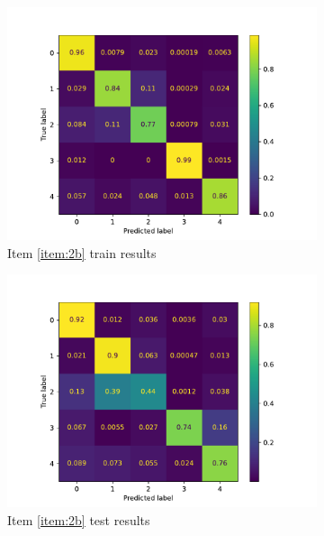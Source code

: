\documentclass[10pt, a4paper]{article}
\begin{document}
\begin{figure}[htpb]
\begin{subfigure}[b]{0.47\textwidth}
    \centering
    \includegraphics[width=\textwidth]{images/Patch64_scratch_cm_train.pdf}
    \caption{Item \ref{item:2b} train results}
    \label{fig:q2b_cm_train}
  \end{subfigure}
  \hfill
  \begin{subfigure}[b]{0.47\textwidth}
    \centering
    \includegraphics[width=\textwidth]{images/Patch64_scratch_cm_test.pdf}
    \caption{Item \ref{item:2b} test results}
    \label{fig:q2b_cm_test}
  \end{subfigure}
  \hfill
  \begin{subfigure}[b]{0.47\textwidth}
    \centering

\end{subfigure}
\end{figure}
\end{document}
